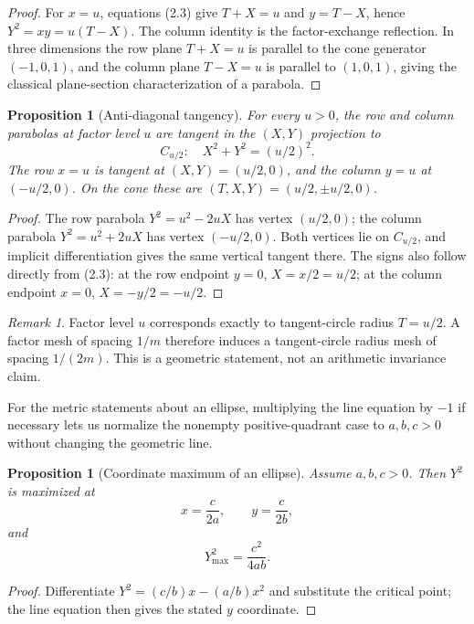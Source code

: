 \documentclass[11pt]{amsart}
\newtheorem{proposition}[theorem]{Proposition}
\theoremstyle{remark}
\newtheorem*{remark}{Remark}
\begin{document}
\begin{proof}
For $x=u$, equations (2.3) give $T+X=u$ and $y=T-X$, hence $Y^2=xy=u(T-X)$. The column identity is the factor-exchange reflection. In three dimensions the row plane $T+X=u$ is parallel to the cone generator $(-1,0,1)$, and the column plane $T-X=u$ is parallel to $(1,0,1)$, giving the classical plane-section characterization of a parabola.
\end{proof}

\begin{proposition}[Anti-diagonal tangency]\label{prop:tangent}
For every $u>0$, the row and column parabolas at factor level $u$ are tangent in the $(X,Y)$ projection to
\[
C_{u/2}:\quad X^2+Y^2=(u/2)^2.
\]
The row $x=u$ is tangent at $(X,Y)=(u/2,0)$, and the column $y=u$ at $(-u/2,0)$. On the cone these are $(T,X,Y)=(u/2,\pm u/2,0)$.
\end{proposition}
\begin{proof}
The row parabola $Y^2=u^2-2uX$ has vertex $(u/2,0)$; the column parabola $Y^2=u^2+2uX$ has vertex $(-u/2,0)$. Both vertices lie on $C_{u/2}$, and implicit differentiation gives the same vertical tangent there. The signs also follow directly from (2.3): at the row endpoint $y=0$, $X=x/2=u/2$; at the column endpoint $x=0$, $X=-y/2=-u/2$.
\end{proof}

\begin{remark}
Factor level $u$ corresponds exactly to tangent-circle radius $T=u/2$. A factor mesh of spacing $1/m$ therefore induces a tangent-circle radius mesh of spacing $1/(2m)$. This is a geometric statement, not an arithmetic invariance claim.
\end{remark}

For the metric statements about an ellipse, multiplying the line equation by $-1$ if necessary lets us normalize the nonempty positive-quadrant case to $a,b,c>0$ without changing the geometric line.

\begin{proposition}[Coordinate maximum of an ellipse]\label{prop:semiaxes}
Assume $a,b,c>0$. Then $Y^2$ is maximized at
\[
x=\frac{c}{2a},\qquad y=\frac{c}{2b},
\]
and
\[
Y_{\max}^2=\frac{c^2}{4ab}.
\]
\end{proposition}
\begin{proof}
Differentiate $Y^2=(c/b)x-(a/b)x^2$ and substitute the critical point; the line equation then gives the stated $y$ coordinate.
\end{proof}
\end{document}
